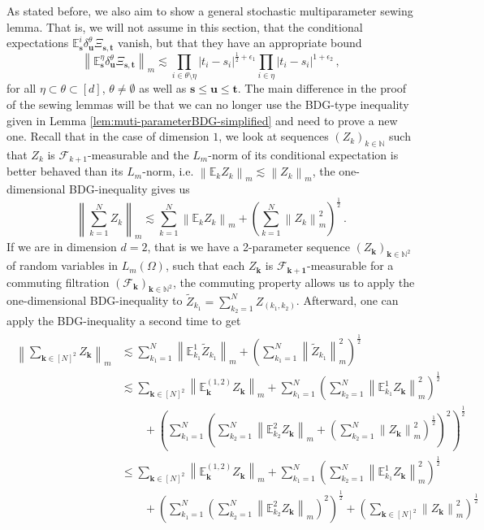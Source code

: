 \documentclass[11pt,oneside,english,reqno]{amsart}
\numberwithin{equation}{section}
\numberwithin{figure}{section}
\theoremstyle{plain}
\theoremstyle{definition}
\theoremstyle{remark}
\theoremstyle{plain}
\theoremstyle{plain}
\theoremstyle{plain}
\theoremstyle{plain}
\theoremstyle{plain}
\newcommand{\cF}{\mathcal{F}}
\newcommand{\EE}{\mathbb{E}}
\newcommand{\NN}{\mathbb{N}}
\newcommand{\bk}{\mathbf{k}}
\newcommand{\bu}{\mathbf{u}}
\newcommand{\bs}{\mathbf{s}}
\newcommand{\bt}{\mathbf{t}}
\newcommand{\norm}[1]{\left\lVert #1\right\rVert}
\newcommand{\abs}[1]{\left\lvert #1\right\rvert}
\begin{document}
As stated before, we also aim to show a general stochastic multiparameter sewing lemma. That is, we will not assume in this section, that the conditional expectations $\EE^i_\bs \delta^\theta_\bu\Xi_{\bs,\bt}$ vanish, but that they have an appropriate bound
%
\begin{equation*}
    \norm{\EE^\eta_\bs \delta^\theta_\bu\Xi_{\bs,\bt}}_m\lesssim\prod_{i\in\theta\setminus\eta}\abs{t_i-s_i}^{\frac 12+\epsilon_1}\prod_{i\in\eta}\abs{t_i-s_i}^{1+\epsilon_2}\,,
\end{equation*}
%
for all $\eta\subset\theta\subset[d]$, $\theta\neq\emptyset$ as well as $\bs\le\bu\le\bt$. The main difference in the proof of the sewing lemmas will be that we can no longer use the BDG-type inequality given in Lemma \ref{lem:muti-parameterBDG-simplified} and need to prove a new one. Recall that in the case of dimension $1$, we look at sequences $(Z_k)_{k\in\NN}$ such that $Z_k$ is $\cF_{k+1}$-measurable and the $L_m$-norm of its conditional expectation is better behaved than its $L_m$-norm, i.e. $\norm{\EE_kZ_k}_m\lesssim \norm{Z_k}_m$, the one-dimensional BDG-inequality gives us
%
\begin{equation*}
    \norm{\sum_{k=1}^N Z_k}_m\lesssim \sum_{k=1}^N\norm{\EE_kZ_k}_m + \left(\sum_{k=1}^N\norm{Z_k}_m^2\right)^{\frac 12}\,.
\end{equation*}
%
If we are in dimension $d=2$, that is we have a 2-parameter sequence $(Z_\bk)_{\bk\in\NN^2}$ of random variables in $L_m(\Omega)$, such that each $Z_\bk$ is $\cF_{\bk+\boldsymbol 1}$-measurable for a commuting filtration $(\cF_\bk)_{\bk\in\NN^2}$, the commuting property allows us to apply the one-dimensional BDG-inequality to $\tilde Z_{k_1} = \sum_{k_2=1}^N Z_{(k_1,k_2)}$. Afterward, one can apply the BDG-inequality a second time to get
%
\begin{align}
\begin{split}\label{term:sum_Z_k_not_possible}
    \norm{\sum_{\bk \in[N]^2} Z_\bk}_m &\lesssim \sum_{k_1=1}^N\norm{\EE^1_{k_1} \tilde Z_{k_1}}_m + \left(\sum_{k_1=1}^N \norm{\tilde Z_{k_1}}_m^2\right)^{\frac 12}\\
    &\lesssim \sum_{\bk\in[N]^2}\norm{\EE^{(1,2)}_\bk Z_\bk}_m + \sum_{k_1 = 1}^N \left(\sum_{k_2=1}^N \norm{\EE^1_{k_1}Z_\bk}_m^2\right)^{\frac 12} \\
    &\qquad +\left(\sum_{k_1=1}^N \left(\sum_{k_2=1}^N \norm{\EE_{k_2}^2 Z_\bk}_m + \left(\sum_{k_2=1}^N\norm{Z_\bk}_m^2\right)^{\frac 12}\right)^2\right)^{\frac 12}\\
    &\le \sum_{\bk\in[N]^2}\norm{\EE^{(1,2)}_\bk Z_\bk}_m + \sum_{k_1 = 1}^N \left(\sum_{k_2=1}^N \norm{\EE^1_{k_1}Z_\bk}_m^2\right)^{\frac 12} \\
    &\qquad +\left(\sum_{k_1=1}^N \left(\sum_{k_2=1}^N \norm{\EE_{k_2}^2 Z_\bk}_m \right)^2\right)^{\frac 12} + \left(\sum_{\bk\in[N]^2}\norm{Z_\bk}_m^2\right)^{\frac 12}
\end{split}
\end{align}
\end{document}
